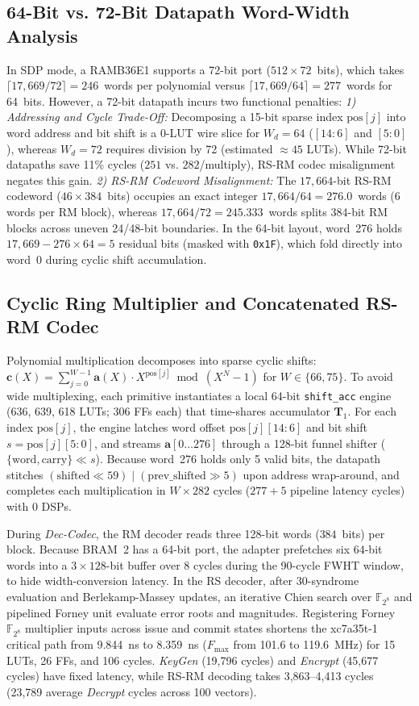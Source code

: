 \documentclass[journal]{IEEEtran}
\begin{document}
\subsection{64-Bit vs. 72-Bit Datapath Word-Width Analysis}
In SDP mode, a RAMB36E1 supports a 72-bit port ($512 \times 72$~bits), which takes $\lceil 17,669 / 72 \rceil = 246$~words per polynomial versus $\lceil 17,669 / 64 \rceil = 277$~words for 64~bits. However, a 72-bit datapath incurs two functional penalties:
\textit{1) Addressing and Cycle Trade-Off:} Decomposing a 15-bit sparse index $\text{pos}[j]$ into word address and bit shift is a 0-LUT wire slice for $W_d = 64$ ($[14:6]$ and $[5:0]$), whereas $W_d = 72$ requires division by 72 (estimated $\approx 45$ LUTs). While 72-bit datapaths save 11\% cycles ($251$ vs. $282$/multiply), RS-RM codec misalignment negates this gain.
\textit{2) RS-RM Codeword Misalignment:} The $17,664$-bit RS-RM codeword ($46 \times 384$~bits) occupies an exact integer $17,664/64 = 276.0$~words (6 words per RM block), whereas $17,664/72 = 245.333$~words splits 384-bit RM blocks across uneven 24/48-bit boundaries.
In the 64-bit layout, word~276 holds $17,669 - 276 \times 64 = 5$ residual bits (masked with \texttt{0x1F}), which fold directly into word~0 during cyclic shift accumulation.

\subsection{Cyclic Ring Multiplier and Concatenated RS-RM Codec}
Polynomial multiplication decomposes into sparse cyclic shifts: $\mathbf{c}(X) = \sum_{j=0}^{W-1} \mathbf{a}(X) \cdot X^{\text{pos}[j]} \bmod (X^N - 1)$ for $W \in \{66, 75\}$. To avoid wide multiplexing, each primitive instantiates a local 64-bit \texttt{shift\_acc} engine (636, 639, 618 LUTs; 306 FFs each) that time-shares accumulator $\mathbf{T}_1$. For each index $\text{pos}[j]$, the engine latches word offset $\text{pos}[j][14:6]$ and bit shift $s = \text{pos}[j][5:0]$, and streams $\mathbf{a}[0 \dots 276]$ through a 128-bit funnel shifter ($\{\text{word}, \text{carry}\} \ll s$). Because word~276 holds only 5 valid bits, the datapath stitches $(\text{shifted} \ll 59) \mathbin{|} (\text{prev\_shifted} \gg 5)$ upon address wrap-around, and completes each multiplication in $W \times 282$ cycles ($277+5$ pipeline latency cycles) with 0 DSPs.

During \textit{Dec-Codec}, the RM decoder reads three 128-bit words ($384$~bits) per block. Because BRAM~2 has a 64-bit port, the adapter prefetches six 64-bit words into a $3 \times 128$-bit buffer over 8 cycles during the 90-cycle FWHT window, to hide width-conversion latency. In the RS decoder, after 30-syndrome evaluation and Berlekamp-Massey updates, an iterative Chien search over $\mathbb{F}_{2^8}$ and pipelined Forney unit evaluate error roots and magnitudes. Registering Forney $\mathbb{F}_{2^8}$ multiplier inputs across issue and commit states shortens the xc7a35t-1 critical path from 9.844~ns to 8.359~ns ($F_{\max}$ from 101.6 to 119.6~MHz) for 15 LUTs, 26 FFs, and 106 cycles. \textit{KeyGen} (19,796 cycles) and \textit{Encrypt} (45,677 cycles) have fixed latency, while RS-RM decoding takes 3,863--4,413 cycles (23,789 average \textit{Decrypt} cycles across 100 vectors).
\end{document}

